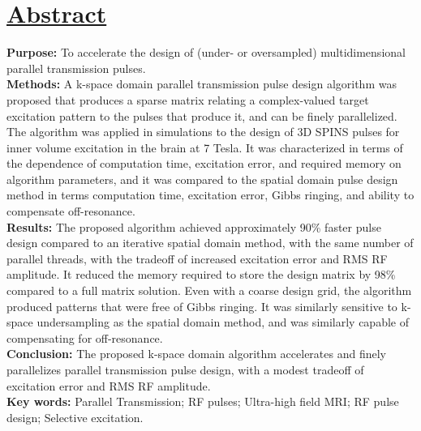 \documentclass[11pt]{article}
\newcommand{\revbox}[1]{\marginpar{\framebox{\textcolor{blue}{#1}}}}
\newcommand{\revbox}[1]{}
\renewcommand{\textcolor}[1]{}
\begin{document}
\section*{\underline{Abstract}} 
{\bf Purpose:}
To accelerate the design of \textcolor{blue}{(under- or oversampled)}\revbox{R1.4} multidimensional parallel transmission pulses. 
\\[1em]
{\bf Methods:}
A k-space domain parallel transmission pulse design algorithm was proposed that
produces a sparse matrix relating a \textcolor{blue}{complex-valued}\revbox{R1.1} target excitation pattern to the pulses that produce it, 
and can be finely parallelized. 
The algorithm was applied in simulations to the design of 3D SPINS pulses for inner volume excitation in the brain at 7 Tesla.
It was characterized in terms of the dependence of computation time, excitation error, and required memory
on algorithm parameters,
and it was compared to the spatial domain pulse design method in terms computation time, excitation error,
Gibbs ringing, and ability to compensate off-resonance.
\\[1em]
{\bf Results:}
The proposed algorithm achieved approximately 90\% faster pulse design compared to 
an iterative spatial domain method, with the same number of parallel threads,
with the tradeoff of increased excitation error and RMS RF amplitude. 
It reduced the memory required to store the design matrix by 98\% compared to a full matrix solution.
Even with a coarse design grid, the algorithm produced patterns that were free of Gibbs ringing.
It was similarly sensitive to k-space undersampling as the spatial domain method,
and was similarly capable of compensating for off-resonance.
\\[1em]
{\bf Conclusion:}
The proposed k-space domain algorithm accelerates and finely parallelizes parallel transmission pulse design,
with a modest tradeoff of excitation error and RMS RF amplitude.
\\[1em]
{\bf \noindent Key words:} Parallel Transmission; RF pulses; Ultra-high field MRI; RF pulse design; Selective excitation.

\pagebreak











\end{document}
